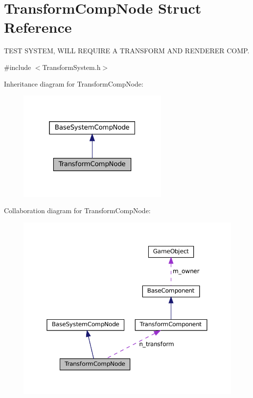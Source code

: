 \hypertarget{structTransformCompNode}{}\section{Transform\+Comp\+Node Struct Reference}
\label{structTransformCompNode}


T\+E\+ST S\+Y\+S\+T\+EM, W\+I\+LL R\+E\+Q\+U\+I\+RE A T\+R\+A\+N\+S\+F\+O\+RM A\+ND R\+E\+N\+D\+E\+R\+ER C\+O\+MP.  




{\ttfamily \#include $<$Transform\+System.\+h$>$}



Inheritance diagram for Transform\+Comp\+Node\+:
\nopagebreak
\begin{figure}[H]
\begin{center}
\leavevmode
\includegraphics[width=211pt]{structTransformCompNode__inherit__graph}
\end{center}
\end{figure}


Collaboration diagram for Transform\+Comp\+Node\+:
\nopagebreak
\begin{figure}[H]
\begin{center}
\leavevmode
\includegraphics[width=350pt]{structTransformCompNode__coll__graph}
\end{center}
\end{figure}
